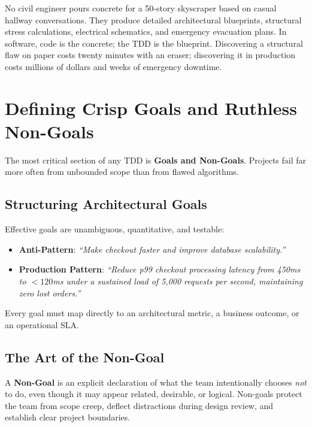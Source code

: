 \begin{intuitionbox}
No civil engineer pours concrete for a 50-story skyscraper based on casual hallway conversations. They produce detailed architectural blueprints, structural stress calculations, electrical schematics, and emergency evacuation plans. In software, code is the concrete; the TDD is the blueprint. Discovering a structural flaw on paper costs twenty minutes with an eraser; discovering it in production costs millions of dollars and weeks of emergency downtime.
\end{intuitionbox}

\section{Defining Crisp Goals and Ruthless Non-Goals}

The most critical section of any TDD is \textbf{Goals and Non-Goals}. Projects fail far more often from unbounded scope than from flawed algorithms.

\subsection{Structuring Architectural Goals}

Effective goals are unambiguous, quantitative, and testable:
\begin{itemize}[leftmargin=18pt]
  \item \textbf{Anti-Pattern}: \textit{``Make checkout faster and improve database scalability.''}
  \item \textbf{Production Pattern}: \textit{``Reduce p99 checkout processing latency from 450ms to $<120$ms under a sustained load of 5,000 requests per second, maintaining zero lost orders.''}
\end{itemize}

Every goal must map directly to an architectural metric, a business outcome, or an operational SLA.

\subsection{The Art of the Non-Goal}

A \textbf{Non-Goal} is an explicit declaration of what the team intentionally chooses \textit{not} to do, even though it may appear related, desirable, or logical. Non-goals protect the team from scope creep, deflect distractions during design review, and establish clear project boundaries.

